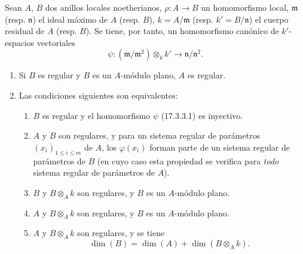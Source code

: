 \begin{proposition}[17.3.3]
\label{0.17.3.3-es}
Sean $A$, $B$ dos anillos locales noetherianos,
$\rho:A\longrightarrow B$ un homomorfismo local, $\mathfrak{m}$ \textup{(resp.
$\mathfrak n$)} el ideal máximo de $A$ \textup{(resp. $B$)},
$k=A/\mathfrak{m}$ \textup{(resp. $k'=B/\mathfrak{n}$)} el cuerpo residual de $A$
\textup{(resp. $B$)}. Se tiene, por tanto, un homomorfismo canónico de $k'$-espacios
vectoriales
\begin{equation}
\label{0.17.3.3.1-es}
\tag{17.3.3.1}
  \psi:(\mathfrak{m}/\mathfrak{m}^2)\otimes_k k'
  \longrightarrow\mathfrak{n}/\mathfrak{n}^2.
\end{equation}
\begin{enumerate}
  \item[\rm (i)] Si $B$ es regular y $B$ es un $A$-módulo plano, $A$ es
  regular.
  \item[\rm (ii)] Las condiciones siguientes son equivalentes:
  \begin{enumerate}
    \item[\textit{a)}] $B$ es regular y el homomorfismo $\psi$ \textup{(17.3.3.1)} es
    inyectivo.
    \item[\textit{b)}] $A$ y $B$ son regulares, y para un sistema regular de
    parámetros $(x_i)_{1\leq i\leq m}$ de $A$, los $\varphi(x_i)$ forman parte
    de un sistema regular de parámetros de $B$ \textup{(en cuyo caso esta propiedad se
    verifica para \emph{todo} sistema regular de parámetros de $A$)}.
    \item[\textit{c)}] $B$ y $B\otimes_A k$ son regulares, y $B$ es un $A$-módulo
    plano.
    \item[\textit{d)}] $A$ y $B\otimes_A k$ son regulares, y $B$ es un $A$-módulo
    plano.
    \item[\textit{e)}] $A$ y $B\otimes_A k$ son regulares, y se tiene
    \begin{equation}
    \label{0.17.3.3.2-es}
    \tag{17.3.3.2}
      \dim(B)=\dim(A)+\dim(B\otimes_A k).
    \end{equation}
  \end{enumerate}
\end{enumerate}
\end{proposition}

